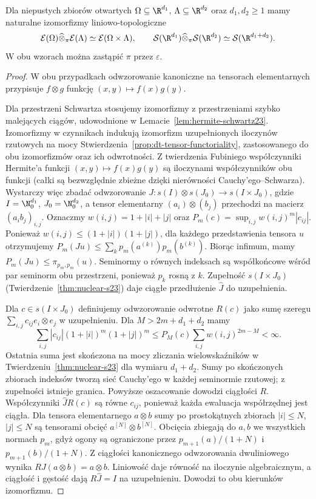 \begin{twierdzenie}
\label{thm:smooth-schwartz-tensor24}
Dla niepustych zbiorów otwartych $\Omega\subseteq\R^{d_1}$,
$\Lambda\subseteq\R^{d_2}$ oraz $d_1,d_2\ge1$ mamy
naturalne izomorfizmy liniowo-topologiczne
\[
 \mathcal E(\Omega)\widehat\otimes_\pi\mathcal E(\Lambda)
 \simeq \mathcal E(\Omega\times\Lambda),\qquad
 \mathcal S(\R^{d_1})\widehat\otimes_\pi\mathcal S(\R^{d_2})
 \simeq \mathcal S(\R^{d_1+d_2}).
\]
W obu wzorach można zastąpić $\pi$ przez $\varepsilon$.
\end{twierdzenie}
\begin{proof}
W obu przypadkach odwzorowanie kanoniczne na tensorach
elementarnych przypisuje $f\otimes g$ funkcję
$(x,y)\mapsto f(x)g(y)$.

Dla przestrzeni Schwartza stosujemy izomorfizmy z
przestrzeniami szybko malejących ciągów, udowodnione
w Lemacie~\ref{lem:hermite-schwartz23}.
Izomorfizmy w czynnikach indukują izomorfizm
uzupełnionych iloczynów rzutowych na mocy
Stwierdzenia~\ref{prop:dt-tensor-functoriality},
zastosowanego do obu izomorfizmów oraz ich odwrotności.
Z twierdzenia Fubiniego współczynniki Hermite'a
funkcji $(x,y)\mapsto f(x)g(y)$ są iloczynami
współczynników obu funkcji (całki są bezwzględnie
zbieżne dzięki nierówności Cauchy'ego--Schwarza).
Wystarczy więc zbadać odwzorowanie
$J:s(I)\otimes s(J_0)\to s(I\times J_0)$,
gdzie $I=\N_0^{d_1}$, $J_0=\N_0^{d_2}$,
a tensor elementarny $(a_i)\otimes(b_j)$
przechodzi na macierz $(a_i b_j)_{i,j}$.
Oznaczmy $w(i,j)=1+|i|+|j|$ oraz
$P_m(c)=\sup_{i,j}w(i,j)^m|c_{ij}|$.
Ponieważ $w(i,j)\le(1+|i|)(1+|j|)$,
dla każdego przedstawienia tensora $u$ otrzymujemy
$P_m(Ju)\le\sum_k p_m(a^{(k)})p_m(b^{(k)})$.
Biorąc infimum, mamy
$P_m(Ju)\le\pi_{p_m,p_m}(u)$.
Seminormy o równych indeksach są współkońcowe
wśród par seminorm obu przestrzeni, ponieważ
$p_k$ rosną z $k$. Zupełność $s(I\times J_0)$
(Twierdzenie~\ref{thm:nuclear-s23}) daje ciągłe
przedłużenie $\widehat J$ do uzupełnienia.

Dla $c\in s(I\times J_0)$ definiujemy odwzorowanie
odwrotne $R(c)$ jako sumę szeregu
$\sum_{i,j}c_{ij}e_i\otimes e_j$ w uzupełnieniu.
Dla $M>2m+d_1+d_2$ mamy
\[
 \sum_{i,j}|c_{ij}|(1+|i|)^m(1+|j|)^m
 \le P_M(c)\sum_{i,j}w(i,j)^{2m-M}<\infty.
\]
Ostatnia suma jest skończona na mocy zliczania
wielowskaźników w Twierdzeniu~\ref{thm:nuclear-s23}
dla wymiaru $d_1+d_2$. Sumy po skończonych zbiorach
indeksów tworzą sieć Cauchy'ego w każdej seminormie
rzutowej; z zupełności istnieje granica.
Powyższe oszacowanie dowodzi ciągłości $R$.
Współczynniki $\widehat J R(c)$ są równe $c_{ij}$,
ponieważ każda ewaluacja współrzędnej jest ciągła.
Dla tensora elementarnego $a\otimes b$ sumy po
prostokątnych zbiorach $|i|\le N$, $|j|\le N$
są tensorami obcięć $a^{[N]}\otimes b^{[N]}$.
Obcięcia zbiegają do $a,b$ we wszystkich normach
$p_m$, gdyż ogony są ograniczone przez
$p_{m+1}(a)/(1+N)$ i $p_{m+1}(b)/(1+N)$.
Z ciągłości kanonicznego odwzorowania dwuliniowego
wynika $R J(a\otimes b)=a\otimes b$.
Liniowość daje równość na iloczynie algebraicznym,
a ciągłość i gęstość dają $R\widehat J=I$ na
uzupełnieniu. Dowodzi to obu kierunków izomorfizmu.


\end{proof}
